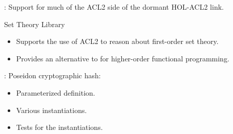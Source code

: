 
\begin{frame}

\newlibtitle

:
Support for much of the ACL2 side of the dormant HOL-ACL2 link.

\newlibtitle

Set Theory Library
\begin{itemize}
\item Supports the use of ACL2 to reason about first-order set theory.
\item Provides an alternative to  for higher-order
      functional programming.
\end{itemize}

\end{frame}


\begin{frame}

\newlibtitle

:
Poseidon cryptographic hash:
\begin{itemize}
\item Parameterized definition.
\item Various instantiations.
\item Tests for the instantiations.
\end{itemize}

\end{frame}


